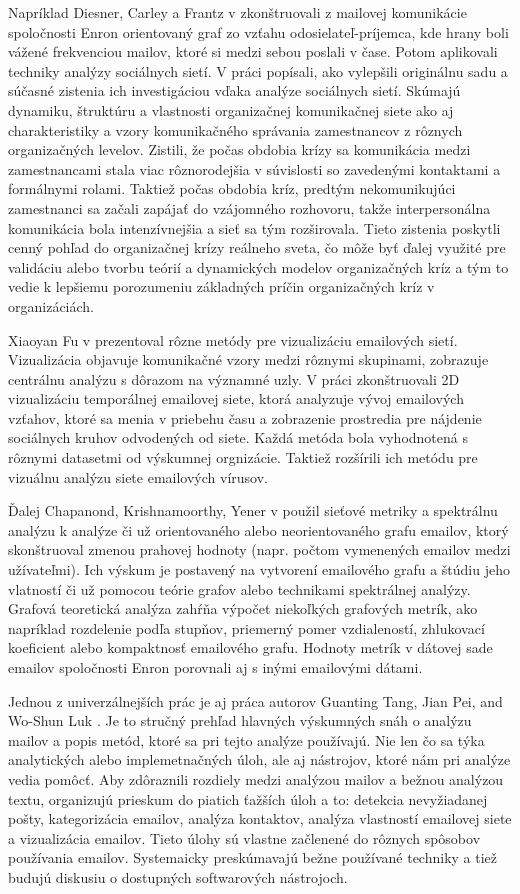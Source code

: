 \documentclass[slovak,master,public,dept460,male,cpdeclaration,oneside]{diploma}
\begin{document}
Napríklad Diesner, Carley a Frantz v \cite{3} zkonštruovali z mailovej komunikácie spoločnosti Enron orientovaný graf zo vzťahu odosielateľ-príjemca, kde hrany boli vážené frekvenciou mailov, ktoré si medzi sebou poslali v čase. Potom aplikovali techniky analýzy sociálnych sietí. V práci popísali, ako vylepšili originálnu sadu a súčasné zistenia ich investigáciou vďaka analýze sociálnych sietí. Skúmajú dynamiku, štruktúru a vlastnosti organizačnej komunikačnej siete ako aj charakteristiky a vzory komunikačného správania zamestnancov z rôznych organizačných levelov. Zistili, že počas obdobia krízy sa komunikácia medzi zamestnancami stala viac rôznorodejšia v súvislosti so zavedenými kontaktami a formálnymi rolami. Taktiež počas obdobia kríz, predtým nekomunikujúci zamestnanci sa začali zapájať do vzájomného rozhovoru, takže interpersonálna komunikácia bola intenzívnejšia a sieť sa tým rozširovala. Tieto zistenia poskytli cenný pohľad do organizačnej krízy reálneho sveta, čo môže byť ďalej využité pre validáciu alebo tvorbu teórií a dynamických modelov organizačných kríz a tým to vedie k lepšiemu porozumeniu základných príčin organizačných kríz v organizáciách.


Xiaoyan Fu v \cite{2} prezentoval rôzne metódy pre vizualizáciu emailových sietí. Vizualizácia objavuje komunikačné vzory medzi rôznymi skupinami, zobrazuje centrálnu analýzu s dôrazom na významné uzly.
V práci zkonštruovali 2D vizualizáciu temporálnej emailovej siete, ktorá analyzuje vývoj emailových vzťahov, ktoré sa menia v priebehu času a zobrazenie prostredia pre nájdenie sociálnych kruhov odvodených od siete. Každá metóda bola vyhodnotená s rôznymi datasetmi od výskumnej orgnizácie. Taktiež rozšírili ich metódu pre vizuálnu analýzu siete emailových vírusov.

Ďalej Chapanond, Krishnamoorthy, Yener v \cite{4} použil sieťové metriky a spektrálnu analýzu k analýze či už orientovaného alebo neorientovaného grafu emailov, ktorý skonštruoval zmenou prahovej hodnoty (napr. počtom vymenených emailov medzi užívateľmi). Ich výskum je postavený na vytvorení emailového grafu a štúdiu jeho vlatností či už pomocou teórie grafov alebo technikami spektrálnej analýzy. Grafová teoretická analýza zahŕňa výpočet niekoľkých grafových metrík, ako napríklad rozdelenie podľa stupňov, priemerný pomer vzdialeností, zhlukovací koeficient alebo kompaktnosť emailového grafu. Hodnoty metrík v dátovej sade emailov spoločnosti Enron porovnali aj s inými emailovými dátami. 

Jednou z univerzálnejších prác je aj práca autorov Guanting Tang, Jian Pei, and Wo-Shun Luk \cite{1}. Je to stručný prehľad hlavných výskumných snáh o analýzu mailov a popis metód, ktoré sa pri tejto analýze používajú. Nie len čo sa týka analytických alebo implemetnačných úloh, ale aj nástrojov, ktoré nám pri analýze vedia pomôcť. Aby zdôraznili rozdiely medzi analýzou mailov a bežnou analýzou textu, organizujú prieskum do piatich ťažších úloh a to:  detekcia nevyžiadanej pošty, kategorizácia emailov, analýza kontaktov, analýza vlastností emailovej siete a vizualizácia emailov. Tieto úlohy sú vlastne začlenené do rôznych spôsobov používania emailov. Systemaicky preskúmavajú bežne používané techniky a tiež budujú diskusiu o dostupných softwarových nástrojoch.
\end{document}
